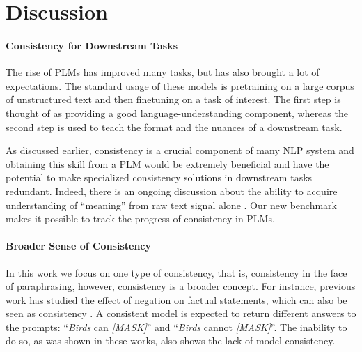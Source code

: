 \section{Discussion}
\label{sec:discussion}

\paragraph{Consistency for Downstream Tasks}

The rise of PLMs has improved many tasks, but has also brought a lot of expectations. The standard usage of these models is  pretraining on a large corpus of unstructured text and then finetuning on a task of interest. The first step is thought of as providing a good language-understanding component, whereas the second step is used to teach the format and the nuances of a downstream task.

As discussed earlier, consistency is a crucial component of many NLP system \cite{du2019consistent,consistent-qa,denis2009global,kryscinski2020evaluating} and obtaining this skill from a PLM would be extremely beneficial and have the potential to make specialized consistency solutions in downstream tasks redundant.
Indeed, there is an ongoing discussion about the ability to acquire understanding of ``meaning'' from raw text signal alone \cite{bender2020climbing}.
Our new benchmark makes it possible to track the progress of consistency in PLMs.


\paragraph{Broader Sense of Consistency}
In this work we focus on one type of consistency, that is,
consistency in the face of paraphrasing, however, consistency is
a broader concept.  For instance, previous work has studied
the effect of negation on factual statements, which can also
be seen as consistency
\cite{Ettinger_2020,kassner-schutze-2020-negated}. 
A consistent model is expected to return  different answers
to the prompts: ``\textit{Birds} can \textit{[MASK]}'' and
``\textit{Birds} cannot \textit{[MASK]}''. The inability to
do so, as was shown in these works, also shows the lack of
model consistency.


